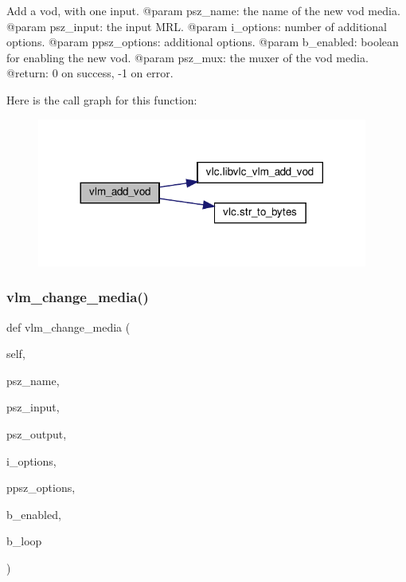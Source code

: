 \begin{DoxyVerb}Add a vod, with one input.
@param psz_name: the name of the new vod media.
@param psz_input: the input MRL.
@param i_options: number of additional options.
@param ppsz_options: additional options.
@param b_enabled: boolean for enabling the new vod.
@param psz_mux: the muxer of the vod media.
@return: 0 on success, -1 on error.
\end{DoxyVerb}
 Here is the call graph for this function\+:
\nopagebreak
\begin{figure}[H]
\begin{center}
\leavevmode
\includegraphics[width=308pt]{classvlc_1_1_instance_a4ef5661bf1bcdef3f131c1d4694c6fe3_cgraph}
\end{center}
\end{figure}
\mbox{\label{classvlc_1_1_instance_a58e7917b82e1cf76c6f2cd73cbcf7cfe}} 
\subsubsection{\texorpdfstring{vlm\+\_\+change\+\_\+media()}{vlm\_change\_media()}}
{\footnotesize\ttfamily def vlm\+\_\+change\+\_\+media (\begin{DoxyParamCaption}\item[{}]{self,  }\item[{}]{psz\+\_\+name,  }\item[{}]{psz\+\_\+input,  }\item[{}]{psz\+\_\+output,  }\item[{}]{i\+\_\+options,  }\item[{}]{ppsz\+\_\+options,  }\item[{}]{b\+\_\+enabled,  }\item[{}]{b\+\_\+loop }\end{DoxyParamCaption})}

